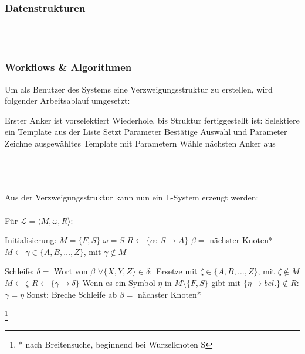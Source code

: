\documentclass[11pt]{article}
\newcommand\blfootnote[1]{%
\begingroup
\renewcommand\thefootnote{}\footnote{#1}%
\addtocounter{footnote}{-1}%
\endgroup
}
\begin{document}
    \subsubsection{Datenstrukturen}
    \\~\\

    \subsubsection{Workflows \& Algorithmen}
    Um als Benutzer des Systems eine Verzweigungsstruktur zu erstellen, wird folgender Arbeitsablauf umgesetzt:
    \begin{algorithm}[caption={Erstellen einer Verzweigungsstruktur}, label={alg1}]
Erster Anker ist vorselektiert
Wiederhole, bis Struktur fertiggestellt ist:
    Selektiere ein Template aus der Liste
    Setzt Parameter
    Bestätige Auswahl und Parameter
    Zeichne ausgewähltes Template mit Parametern
    Wähle nächsten Anker aus
    \end{algorithm}
    \\~\\~\\
    Aus der Verzweigungsstruktur kann nun ein L-System erzeugt werden:
    \\~\\
    Für $\mathcal{L}=\langle M,\omega,R \rangle$:
    \begin{algorithm}[caption={Inferieren eines L-Systems aus einer Baumstruktur}, label={alg2}]
Initialisierung:
    $M=\{F,S\}$
    $\omega=S$
    $R \gets \{\alpha$: $S \rightarrow A\}$
    $\beta=$ nächster Knoten*
    $M \gets \gamma \in \{A,B,\dots,Z\}$, mit $\gamma \notin M$

Schleife:
    $\delta=$ Wort von $\beta$
    $\forall \{X,Y,Z\} \in \delta:$
        Ersetze mit $\zeta \in \{A,B,\dots,Z\}$, mit $\zeta \notin M$
        $M \gets \zeta$
    $R \gets \{\gamma\rightarrow\delta\}$
    Wenn es ein Symbol $\eta$ in $M\setminus\{F,S\}$ gibt mit $\{\eta \rightarrow bel.\} \notin R$:
        $\gamma=\eta$
    Sonst:
        Breche Schleife ab
    $\beta=$ nächster Knoten*
    \end{algorithm}
    \blfootnote{* nach Breitensuche, beginnend bei Wurzelknoten S}

    \newpage
\end{document}
